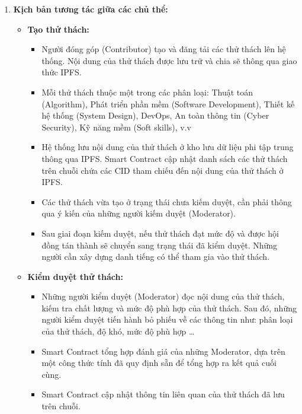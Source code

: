 \documentclass{article}[14pt]
\begin{document}
{\begin{enumerate}[label=\textbf{\alph*.}]
                \item \textbf{Kịch bản tương tác giữa các chủ thể:}
                \begin{itemize}
                    \item \textbf{Tạo thử thách:}
                    \begin{itemize}
                        \item Người đóng góp (Contributor) tạo và đăng tải các thử thách lên hệ thống. Nội dung của thử thách được lưu trữ và chia sẽ thông qua giao thức IPFS.
                        \item Mỗi thử thách thuộc một trong các phân loại: Thuật toán (Algorithm), Phát triển phần mềm (Software Development), Thiết kế hệ thống (System Design), DevOps, An toàn thông tin (Cyber Security), Kỹ năng mềm (Soft skills), v.v
                        \item Hệ thống lưu nội dung của thử thách ở kho lưu dữ liệu phi tập trung thông qua IPFS. Smart Contract cập nhật danh sách các thử thách trên chuỗi chứa các CID tham chiếu đến nội dung của thử thách ở IPFS.  
                        \item Các thử thách vừa tạo ở trạng thái chưa kiếm duyệt, cần phải thông qua ý kiến của những người kiếm duyệt (Moderator). 
                        \item Sau giai đoạn kiếm duyệt, nếu thử thách đạt mức độ và được hội đồng tán thành sẽ chuyển sang trạng thái đã kiểm duyệt. Những người cần xây dựng danh tiếng có thể tham gia vào thử thách. 
                    \end{itemize}

                    \item \textbf{Kiểm duyệt thử thách:}
                    \begin{itemize}
                        \item Những người kiểm duyệt (Moderator) đọc nội dung của thử thách, kiếm tra chất lượng và mức độ phù hợp của thử thách. Sau đó, những người kiểm duyệt tiến hành bỏ phiếu về các thông tin như: phân loại của thử thách, độ khó, mức độ phù hợp \dots
                        \item Smart Contract tổng hợp đánh giá của những Moderator, dựa trên một công thức tính đã quy định sẵn để tổng hợp ra kết quả cuối cùng. 
                        \item Smart Contract cập nhật thông tin liên quan của thử thách đã lưu trên chuỗi. 
                    \end{itemize} 


\end{itemize}
\end{enumerate}}
\end{document}
